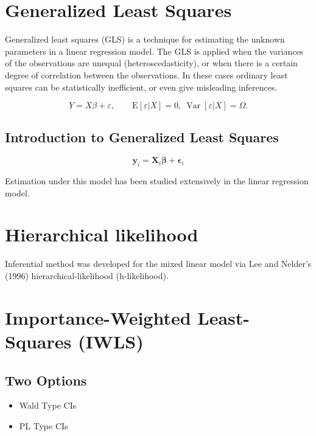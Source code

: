 \documentclass[Main.tex]{subfiles}
\begin{document}
\section{Generalized Least Squares}


Generalized least squares (GLS) is a technique for estimating the unknown parameters in a linear regression model. 
The GLS is applied when the variances of the observations are unequal (heteroscedasticity), or when there is a certain degree of correlation between the observations. 
In these cases ordinary least squares can be statistically inefficient, or even give misleading inferences.



\[ Y = X\beta + \varepsilon, \qquad \mathrm{E}[\varepsilon|X]=0,\ \operatorname{Var}[\varepsilon|X]=\Omega.\]



\subsection{Introduction to Generalized Least Squares}
\begin{equation}
\boldsymbol{y}_i = \boldsymbol{X}_i\boldsymbol{\beta} + \boldsymbol{\epsilon}_i
\end{equation}



Estimation under this model has been studied extensively in the linear regression model.





\section{Hierarchical likelihood} %
Inferential method was developed for the mixed linear model via Lee and Nelder's (1996) hierarchical-likelihood (h-likelihood).

\section{Importance-Weighted Least-Squares (IWLS)}  %









\subsection{Two Options }
\begin{itemize}
	\item Wald Type CIs
	\item PL Type CIs
\end{itemize}
\end{document}
